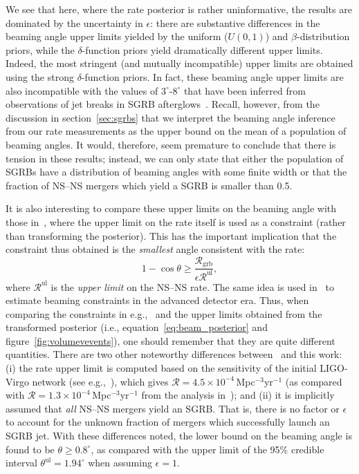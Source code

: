\documentclass[twocolumn,nofootinbib]{revtex4-1}
\newcommand{\grbrate}{{{\mathcal R}_{\mathrm{grb}}}}
\newcommand{\cbcrate}{{{\mathcal R}}}
\newcommand{\BNS}{\ac{NS}--\ac{NS}\xspace}
\begin{document}
We see that here, where the rate posterior is rather uninformative,
the results are dominated by the uncertainty in $\epsilon$: there are
substantive differences in the beaming angle upper limits yielded by
the uniform ($U(0,1)$) and $\beta$-distribution priors, while the
$\delta$-function priors yield dramatically different upper limits.
Indeed, the most stringent (and mutually incompatible) upper limits
are obtained using the strong $\delta$-function priors.  In fact,
these beaming angle upper limits are also incompatible with the values
of $3^{\circ}\mbox{-}8^{\circ}$ that have been inferred from
observations of jet breaks in \ac{SGRB}
afterglows~\cite{Fong:2013lba,2006MNRAS.367L..42P,
  2012A&A...538L...7N}.  Recall, however, from the discussion in
section~\ref{sec:sgrbs} that we interpret the beaming angle inference
from our rate measurements as the upper bound on the mean of a
population of beaming angles.  It would, therefore, seem premature to
conclude that there is tension in these results; instead, we can only
state that either the population of \acp{SGRB} have a distribution of
beaming angles with some finite width or that the fraction of \BNS
mergers which yield a \ac{SGRB} is smaller than 0.5.

It is also interesting to compare these upper limits on the beaming
angle with those in~\cite{Chen:2012qh}, where the upper limit
on the rate itself is used as a constraint (rather than transforming
the posterior).  This has the important implication that the
constraint thus obtained is the \emph{smallest} angle consistent with
the rate:
%
\begin{equation}
    1 - \cos \theta \geq \frac{\grbrate}{\epsilon \cbcrate^{\mathrm{ul}}},
\end{equation}
%
where $\cbcrate^{\mathrm{ul}}$ is the \emph{upper limit} on the \BNS
rate.  The same idea is used in~\cite{Clark:2014jpa} to estimate
beaming constraints in the advanced detector era.  Thus, when
comparing the constraints in e.g.,~\cite{Chen:2012qh} and the
upper limits obtained from the transformed posterior (i.e.,
equation~\ref{eq:beam_posterior} and figure~\ref{fig:volumevevents}), one
should remember that they are quite different quantities.  There are
two other noteworthy differences between~\cite{Chen:2012qh}
and this work: (i) the rate upper limit is computed based on the
sensitivity of the initial LIGO-Virgo network (see
e.g.,~\cite{BradyFairhurst08}), which gives $\cbcrate=4.5\times
10^{-4}$\,Mpc$^{-3}$yr$^{-1}$ (as compared with $\cbcrate=1.3 \times
10^{-4}$\,Mpc$^{-3}$yr$^{-1}$ from the analysis
in~\cite{Colaboration:2011np}); and (ii) it is implicitly assumed that
\emph{all} \BNS mergers yield an \ac{SGRB}.  That is, there is no
factor or $\epsilon$ to account for the unknown fraction of mergers
which successfully launch an \ac{SGRB} jet.  With these differences
noted, the lower bound on the beaming angle is found to be $\theta
\geq 0.8^{\circ}$, as compared with the upper limit of the 95\%
credible interval $\theta^{\mathrm{ul}}=1.94^{\circ}$ when assuming
$\epsilon=1$.
\end{document}

